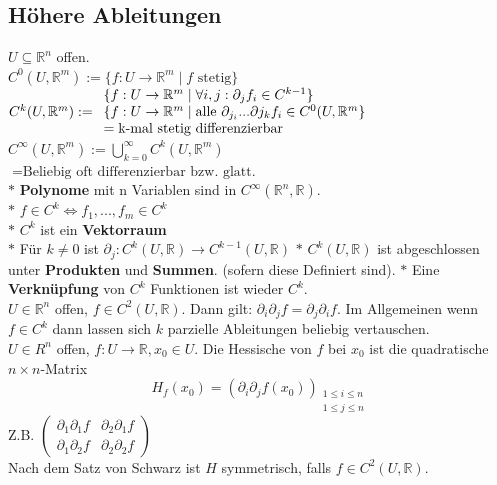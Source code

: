 \subsection{Höhere Ableitungen}
    \(U\subseteq\mathbb R^n\) offen.\\
    \(C^0(U,\mathbb R^m):=\{f:U\rightarrow\mathbb R^m\mid f \text{ stetig}\}\)\\
    \(C^k(U,\mathbb R^m):=\\
    \begin{array}{ll}\{f:U\rightarrow\mathbb R^m\mid \forall i,j:\partial_jf_i\in C^{k-1}\}\\
    \{f:U\rightarrow\mathbb R^m\mid\text{alle }\partial_{j_i}...\partial{j_k}f_i\in C^0(U,\mathbb R^m\}\\=\text{k-mal stetig differenzierbar}\end{array}\)
    \(C^\infty(U,\mathbb R^m):=\bigcup\limits_{k=0}^\infty C^k(U,\mathbb
    R^m)\)\\
    \(=\text{Beliebig oft differenzierbar bzw. glatt.}\)\\ 
    \(*\) \textbf{Polynome} mit n Variablen sind in \(C^\infty(\mathbb R^n,\mathbb R)\).\\
    \(*\) \(f\in C^k\iff f_1,...,f_m\in C^k\)\\
    \(*\) \(C^k\) ist ein \textbf{Vektorraum}\\
    \(*\) Für \(k\neq 0\) ist \(\partial_j: C^k(U,\mathbb R)\rightarrow
    C^{k-1}(U, \mathbb R)\)
    \(*\) \(C^k(U,\mathbb R)\) ist abgeschlossen unter \textbf{Produkten} und
    \textbf{Summen}.
    (sofern diese Definiert sind).
    \(*\) Eine \textbf{Verknüpfung} von \(C^k\) Funktionen ist wieder \(C^k\).\\
    \(U\in\mathbb R^n\) offen, \(f\in C^2(U,\mathbb R)\). Dann gilt:
    \(\partial_i\partial_jf=\partial_j\partial_if\).
    Im Allgemeinen wenn \(f\in C^k\) dann lassen sich \(k\) parzielle
    Ableitungen beliebig vertauschen.\\
    \(U\in R^n\) offen, \(f:U\rightarrow \mathbb R, x_0\in U\).
    Die Hessische von \(f\) bei \(x_0\) ist die quadratische \(n\times
    n\)-Matrix
    \[H_f(x_0)=(\partial_i\partial_j f(x_0))_{\substack{1\leq i\leq n\\ 1\leq j\leq n}}\]
    Z.B. $\begin{pmatrix}
      \partial_1\partial_1f&\partial_2\partial_1f\\\partial_1\partial_2f&\partial_2\partial_2f
    \end{pmatrix}$\\
    Nach dem Satz von Schwarz ist \(H\) symmetrisch, falls \(f\in C^2(U,\mathbb
    R)\).\\
